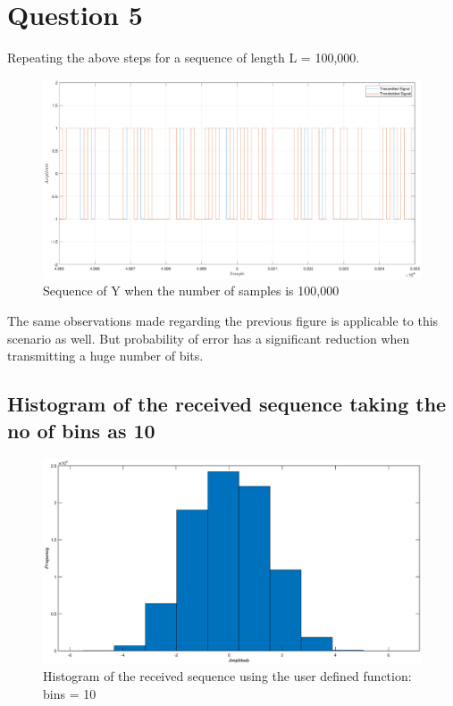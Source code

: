 \documentclass[a4paper,11pt]{article}%
\begin{document}
\section{Question 5}
Repeating the above steps for a sequence of length L = 100,000.
\begin{figure}[!h]
	\centering
	\includegraphics[scale=0.4]{figures/q5f1}
	\caption{Sequence of Y when the number of samples is 100,000}
\end{figure}

The same observations made regarding the previous figure is applicable to this scenario as well. But probability of error has a significant reduction when transmitting a huge number of bits. 

\pagebreak
\subsection{Histogram of the received sequence taking	the no of bins as 10}
\begin{figure}[!h]
	\centering
	\includegraphics[scale=0.45]{figures/q5f2}
	\caption{Histogram of the received sequence using the user defined function: bins = 10}
\end{figure}
\end{document}
